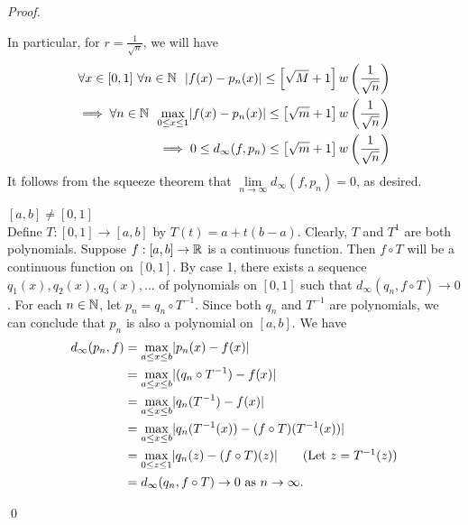 \begin{proof}
\begin{description}
        In particular, for $r = \frac{1}{\sqrt{n}}$, we will have 
        \begin{align*}
            \forall x \in [0,1] ~\forall n \in \mathbb{N} ~~|f(x) - p_n(x)| \leq \left[\sqrt{M} + 1\right]w\left(\frac{1}{\sqrt{n}}\right) \\
            \implies \forall n \in \mathbb{N} ~~\underset{0 \leq x \leq 1}{\max} |f(x) - p_n(x)| \leq \left[\sqrt{m}+1\right]w\left(\frac{1}{\sqrt{n}}\right) \\
            \implies 0 \leq d_\infty(f, p_n) \leq \left[\sqrt{m} + 1\right]w\left(\frac{1}{\sqrt{n}}\right)
        \end{align*}
        It follows from the squeeze theorem that $\lim \limits_{n\to \infty}d_\infty (f, p_n) = 0$, as desired.

        \item[Case 2: ] $[a,b] \neq [0,1]$ \\
        Define $T: [0,1] \to [a,b]$ by $T(t) = a+t(b-a)$. Clearly, $T$ and $T^{1}$ are both polynomials. Suppose $f:[a,b] \to \mathbb{R}$ is a continuous function. Then $f \circ T$ will be a continuous function on $[0,1]$. By case 1, there exists a sequence $q_1(x), q_2(x), q_3(x), ...$ of polynomials on $[0,1]$ such that $d_\infty(q_n, f\circ T) \to 0$. For each $n \in \mathbb{N}$, let $p_n = q_n \circ T^{-1}.$ Since both $q_n$ and $T^{-1}$ are polynomials, we can conclude that $p_n$ is also a polynomial on $[a,b]$. We have
        \begin{align*}
            d_\infty(p_n, f) &= \underset{a \leq x \leq b}{\max}|p_n(x) - f(x)| \\
            &= \underset{a \leq x \leq b}{\max}|(q_n \circ T^{-1})-f(x)| \\
            &= \underset{a \leq x \leq b}{\max}|q_n(T^{-1}) - f(x)| \\
            &= \underset{a \leq x \leq b}{\max}|q_n(T^{-1}(x)) - (f\circ T)(T^{-1}(x))| \\
            &= \underset{0 \leq z \leq 1}{\max}|q_n(z) - (f\circ T)(z)| \tag{Let $z = T^{-1}(z)$} \\
            &= d_\infty(q_n, f\circ T) \to 0 \text{ as } n \to \infty.
        \end{align*}
    \end{description}
    \qed
\end{proof}